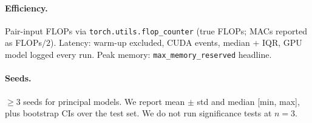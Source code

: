 \paragraph{Efficiency.}
Pair-input FLOPs via \texttt{torch.utils.flop\_counter} (true FLOPs;
MACs reported as FLOPs$/2$). Latency: warm-up excluded, CUDA events,
median + IQR, GPU model logged every run. Peak memory:
\texttt{max\_memory\_reserved} headline.

\paragraph{Seeds.}
$\ge 3$ seeds for principal models. We report mean $\pm$ std and
median [min, max], plus bootstrap CIs over the test set. We do not
run significance tests at $n=3$.

